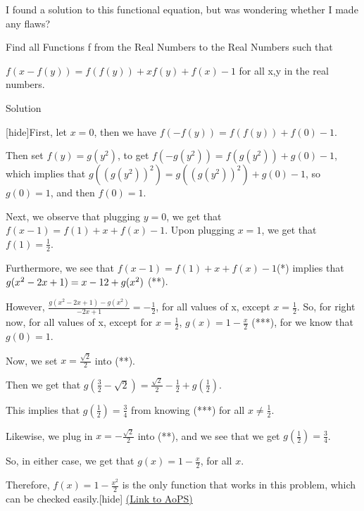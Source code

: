 \begin{problem}
	I found a solution to this functional equation, but was wondering whether I made any flaws?

Find all Functions f from the Real Numbers to the Real Numbers such that

$ f(x-f(y))=f(f(y))+xf(y)+f(x)-1$ for all x,y in the real numbers.

Solution

[hide]First, let $ x=0$, then we have $ f(-f(y))=f(f(y))+f(0)-1$.

Then set $ f(y)=g(y^{2})$, to get $ f(-g(y^{2}))=f(g(y^{2}))+g(0)-1$, which implies that $ g((g(y^{2}))^{2})=g((g(y^{2}))^{2})+g(0)-1$, so $ g(0)=1$, and then $ f(0)=1$.

Next, we observe that plugging $ y=0$, we get that
$ f(x-1)=f(1)+x+f(x)-1$.  Upon plugging $ x=1$, we get that $ f(1)=\frac{1}{2}$.

Furthermore, we see that $ f(x-1)=f(1)+x+f(x)-1$(*) implies that $ g(x^{2}-2x+1)=x-1\/2+g(x^{2})$ (**).

However, $ \frac{g(x^{2}-2x+1)-g(x^{2})}{-2x+1}=-\frac{1}{2}$, for all values of x, except $ x=\frac{1}{2}$.  So, for right now, for all values of x, except for $ x=\frac{1}{2}$, $ g(x)=1-\frac{x}{2}$ (***), for we know that $ g(0)=1$.

Now, we set $ x=\frac{\sqrt{2}}{2}$ into (**).

Then we get that $ g(\frac{3}{2}-\sqrt{2})=\frac{\sqrt{2}}{2}-\frac{1}{2}+g(\frac{1}{2})$.

This implies that $ g(\frac{1}{2})=\frac{3}{4}$ from knowing (***) for all $ x \neq \frac{1}{2}$.

Likewise, we plug in $ x=-\frac{\sqrt{2}}{2}$ into (**), and we see that we get $ g(\frac{1}{2})=\frac{3}{4}$.

So, in either case, we get that $ g(x)=1-\frac{x}{2}$, for all $ x$.

Therefore, $ f(x)=1-\frac{x^{2}}{2}$ is the only function that works in this problem, which can be checked easily.[\/hide]
	\flushright \href{https://artofproblemsolving.com/community/c6h184439}{(Link to AoPS)}
\end{problem}



